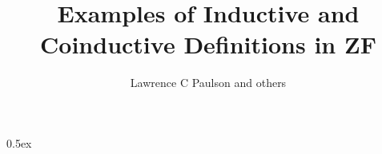 \documentclass[11pt,a4paper]{article}
\begin{document}
\title{Examples of Inductive and Coinductive Definitions in ZF}
\author{Lawrence C Paulson and others}
\maketitle

\tableofcontents

\parindent 0pt\parskip 0.5ex




\end{document}
